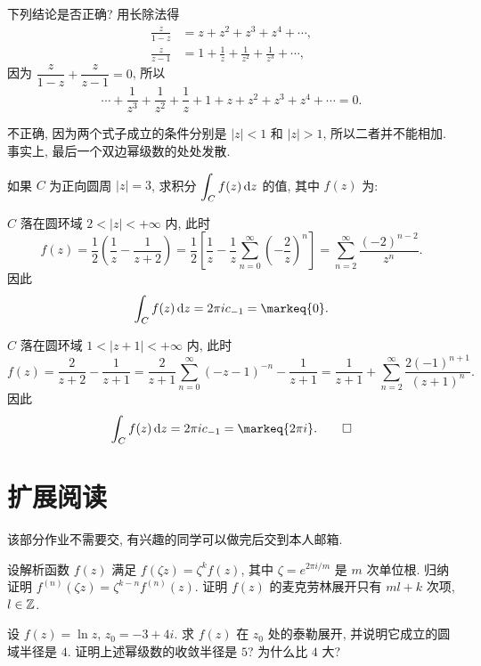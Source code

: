 \begin{exercise}
	下列结论是否正确? 用长除法得
	\begin{align*}
	\frac{z}{1-z}&=z+z^2+z^3+z^4+\cdots,\\
	\frac{z}{z-1}&=1+\frac1z+\frac1{z^2}+\frac1{z^3}+\cdots,
	\end{align*}
	因为 $\dfrac{z}{1-z}+\dfrac{z}{z-1}=0$, 所以
	\[\cdots+\frac1{z^3}+\frac1{z^2}+\frac1z+1+z+z^2+z^3+z^4+\cdots=0.\]
\end{exercise}
\begin{solution}
	不正确, 因为两个式子成立的条件分别是 $|z|<1$ 和 $|z|>1$, 所以二者并不能相加.
	事实上, 最后一个双边幂级数的处处发散.
\end{solution}


\begin{exercise}[2]
	如果 $C$ 为正向圆周 $|z|=3$, 求积分 $\displaystyle\int_Cf(z)\,\mathrm{d} z$ 的值, 其中 $f(z)$ 为:
\end{exercise}
\begin{solution}
	\subex $C$ 落在圆环域 $2<|z|<+\infty$ 内, 此时
	\[f(z)=\frac12\left(\frac1z-\frac1{z+2}\right)
	=\frac12\left[\frac1z-\frac1z\sum_{n=0}^\infty\left(-\frac2z\right)^n\right]
	=\sum_{n=2}^\infty\frac{(-2)^{n-2}}{z^n}.\]
	因此
	\[\int_Cf(z)\diff z=2\pi ic_{-1}=\markeq{0}.\]

	\subex $C$ 落在圆环域 $1<|z+1|<+\infty$ 内, 此时
	\[f(z)=\frac2{z+2}-\frac1{z+1}
	=\frac2{z+1}\sum_{n=0}^\infty(-z-1)^{-n}-\frac1{z+1}
	=\frac1{z+1}+\sum_{n=2}^\infty\frac{2(-1)^{n+1}}{(z+1)^n}.\]
	因此
	\[\int_Cf(z)\diff z=2\pi ic_{-1}=\markeq{2\pi i}.\qedhere\]
\end{solution}


\section*{扩展阅读}
该部分作业不需要交, 有兴趣的同学可以做完后交到本人邮箱.
\begin{exercise}
	设解析函数 $f(z)$ 满足 $f(\zeta z)=\zeta^k f(z)$, 其中 $\zeta=e^{2\pi i/m}$ 是 $m$ 次单位根.
	\subex 归纳证明 $f^{(n)}(\zeta z)=\zeta^{k-n}f^{(n)}(z)$.
	\subex 证明 $f(z)$ 的麦克劳林展开只有 $ml+k$ 次项, $l\in{\mathbb{Z}}$.
\end{exercise}


\begin{exercise}
	设 $f(z)=\ln z$, $z_0=-3+4i$.
	\subex 求 $f(z)$ 在 $z_0$ 处的泰勒展开, 并说明它成立的圆域半径是 $4$.
	\subex 证明上述幂级数的收敛半径是 $5$? 为什么比 $4$ 大?
\end{exercise}


